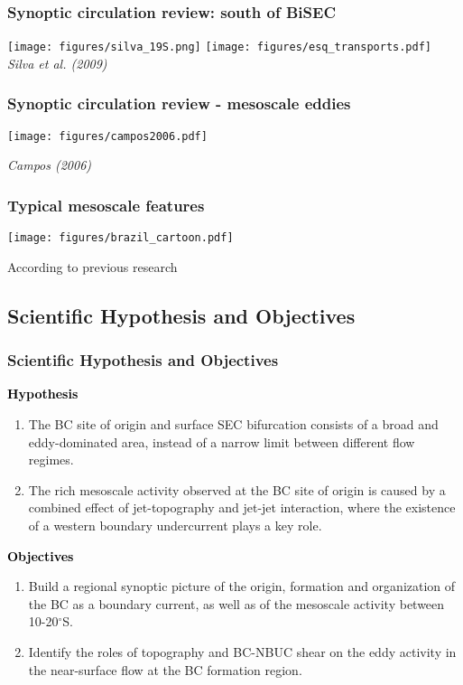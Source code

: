 \documentclass{beamer}
\begin{document}
\frame
{
  \frametitle{Synoptic circulation review: south of BiSEC}
\texttt{[image: figures/silva\_19S.png]}\hspace{1cm}
\texttt{[image: figures/esq\_transports.pdf]}\\
\footnotesize{\it Silva et al. (2009)}
}

\frame
{
  \frametitle{Synoptic circulation review - mesoscale eddies}
\texttt{[image: figures/campos2006.pdf]}

\footnotesize{\it Campos (2006)}
}


\frame
{
  \frametitle{Typical mesoscale features}
\begin{center}
\texttt{[image: figures/brazil\_cartoon.pdf]}
\end{center}

\footnotesize{According to previous research}
}


\subsection{Scientific Hypothesis and Objectives}
\frame
{
  \frametitle{Scientific Hypothesis and Objectives}
\begin{footnotesize}
\begin{alertblock}{\textcolor{black}{\bf Hypothesis}}
  \begin{enumerate}
    \item{The BC site of origin and surface SEC bifurcation consists of a broad and eddy-dominated
          area, instead of a narrow limit between different flow regimes.}
    \item{The rich mesoscale activity observed at the BC site of origin is caused by a combined
          effect of jet-topography and jet-jet interaction, where the existence of a western
          boundary undercurrent plays a key role.}
  \end{enumerate}
\end{alertblock}

\begin{alertblock}{\textcolor{black}{\bf Objectives}}
  \begin{enumerate}
    \item{Build a regional synoptic picture of the origin, formation and organization of the BC as a 
          boundary current, as well as of the mesoscale activity between 10-20$^\circ$S.}
    \item{Identify the roles of topography and BC-NBUC shear on the eddy activity in the near-surface
          flow at the BC formation region.}
  \end{enumerate}
\end{alertblock}
\end{footnotesize}

}
\end{document}
